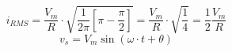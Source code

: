 \documentclass{article}
\begin{document}
        \[
            i_{RMS} = 
                    \frac{V_{m}}{R} \cdot
                    \sqrt{ \frac{1}{2 \pi}
                        \left[
                            \pi - \frac{\pi}{2}
                        \right]
                    }
                    = 
                    \frac{V_{m}}{R} \cdot
                    \sqrt{
                        \frac{1}{4}
                    }
                    = 
                    \frac{1}{2}
                    \frac{V_{m}}{R}
        \]
        \[
            v_{s} = V_{m} \sin(\omega \cdot t + \theta)
        \]
\end{document}

